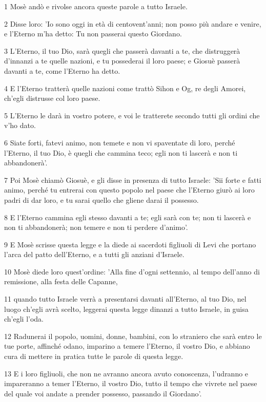 \par 1 Mosè andò e rivolse ancora queste parole a tutto Israele.
\par 2 Disse loro: 'Io sono oggi in età di centovent'anni; non posso più andare e venire, e l'Eterno m'ha detto: Tu non passerai questo Giordano.
\par 3 L'Eterno, il tuo Dio, sarà quegli che passerà davanti a te, che distruggerà d'innanzi a te quelle nazioni, e tu possederai il loro paese; e Giosuè passerà davanti a te, come l'Eterno ha detto.
\par 4 E l'Eterno tratterà quelle nazioni come trattò Sihon e Og, re degli Amorei, ch'egli distrusse col loro paese.
\par 5 L'Eterno le darà in vostro potere, e voi le tratterete secondo tutti gli ordini che v'ho dato.
\par 6 Siate forti, fatevi animo, non temete e non vi spaventate di loro, perché l'Eterno, il tuo Dio, è quegli che cammina teco; egli non ti lascerà e non ti abbandonerà'.
\par 7 Poi Mosè chiamò Giosuè, e gli disse in presenza di tutto Israele: 'Sii forte e fatti animo, perché tu entrerai con questo popolo nel paese che l'Eterno giurò ai loro padri di dar loro, e tu sarai quello che gliene darai il possesso.
\par 8 E l'Eterno cammina egli stesso davanti a te; egli sarà con te; non ti lascerà e non ti abbandonerà; non temere e non ti perdere d'animo'.
\par 9 E Mosè scrisse questa legge e la diede ai sacerdoti figliuoli di Levi che portano l'arca del patto dell'Eterno, e a tutti gli anziani d'Israele.
\par 10 Mosè diede loro quest'ordine: 'Alla fine d'ogni settennio, al tempo dell'anno di remissione, alla festa delle Capanne,
\par 11 quando tutto Israele verrà a presentarsi davanti all'Eterno, al tuo Dio, nel luogo ch'egli avrà scelto, leggerai questa legge dinanzi a tutto Israele, in guisa ch'egli l'oda.
\par 12 Radunerai il popolo, uomini, donne, bambini, con lo straniero che sarà entro le tue porte, affinché odano, imparino a temere l'Eterno, il vostro Dio, e abbiano cura di mettere in pratica tutte le parole di questa legge.
\par 13 E i loro figliuoli, che non ne avranno ancora avuto conoscenza, l'udranno e impareranno a temer l'Eterno, il vostro Dio, tutto il tempo che vivrete nel paese del quale voi andate a prender possesso, passando il Giordano'.
